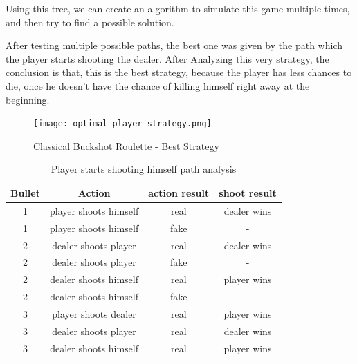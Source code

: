\documentclass{article}
\begin{document}
Using this tree, we can create an algorithm to simulate this game multiple times, and then try to find a possible solution.

After testing multiple possible paths, the best one was given by the path which the player starts shooting the dealer. After Analyzing this very strategy, the conclusion is that, this is the best strategy, because the player has less chances to die, once he doesn't have the chance of killing himself right away at the beginning.

\begin{figure}[h]
	\centering
	\texttt{[image: optimal\_player\_strategy.png]}
	\caption{Classical Buckshot Roulette - Best Strategy}
	\label{fig:classical-model-bckr-optimal-strategy}
\end{figure}

\newpage

\begin{table}[h]
	\begin{center}
		\begin{tabular}{ |c|c|c|c| } 
			\hline
			Bullet & Action & action result & shoot result \\
			\hline
			1 & player shoots himself  & real & dealer wins\\
			\hline
			1 & player shoots himself  & fake & -\\
			\hline
			2 & dealer shoots player  & real & dealer wins\\
			\hline
			2 & dealer shoots player  & fake & -\\
			\hline
			2 & dealer shoots himself  & real & player wins\\
			\hline
			2 & dealer shoots himself  & fake & -\\
			\hline
			3 & player shoots dealer  & real & player wins\\
			\hline
			3 & dealer shoots player & real & dealer wins\\
			\hline
			3 & dealer shoots himself & real & player wins\\
			\hline
		\end{tabular}
		\caption{Player starts shooting himself path analysis}
		\label{table:starts-himself}
	\end{center}
\end{table}
\end{document}
